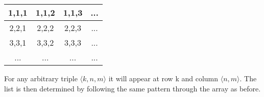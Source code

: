 \documentclass[../../include/open-logic-section]{subfiles}
\begin{document}
\begin{tabular}{c|c|c|c} 
1,1,1 & 1,1,2 & 1,1,3 & ... \\\hline
2,2,1 & 2,2,2 & 2,2,3 & ... \\\hline
3,3,1 & 3,3,2 & 3,3,3 & ... \\\hline
... & ... & ... & ... \\
\end{tabular}

For any arbitrary triple $\langle k,n,m\rangle$ it will appear at row k and
column $\langle n,m\rangle$. The list is then determined by following the
same pattern through the array as before.
\end{document}
